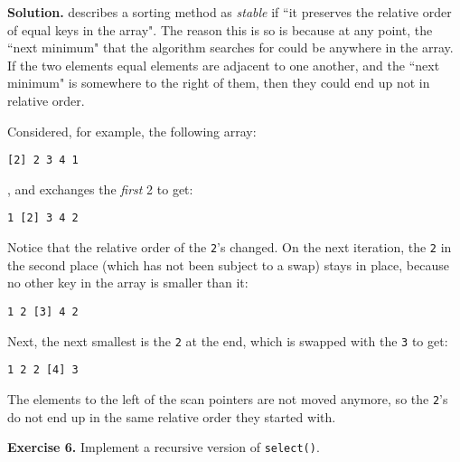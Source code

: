 \documentclass[12pt, a4paper]{article}
\newenvironment{ex}[2][Exercise]
{\par\medskip\noindent \textbf{#1 #2.}}
{\medskip}
\newenvironment{sol}[1][Solution]
{\par\medskip\noindent \textbf{#1.} }
{\medskip}
\begin{document}
	\begin{sol}
		\cite{sedgewick_wayne} describes a sorting method as \emph{stable}
		if ``it preserves the relative order of equal keys in the array".
		The reason this is so is because at any point, the ``next minimum"
		that the algorithm searches for could be anywhere in the array.
		If the two elements equal elements are adjacent to one another, and
		the ``next minimum" is somewhere to the right of them, then
		they could end up not in relative order.
		
		Considered, for example, the following array:
		\begin{lstlisting}[language={}]
[2] 2 3 4 1
		\end{lstlisting}, and exchanges the \emph{first} 2 to get:
		\begin{lstlisting}[language={}]
1 [2] 3 4 2
		\end{lstlisting}
		Notice that the relative order of the \texttt{2}'s changed. On
		the next iteration, the \texttt{2} in the second place (which
		has not been subject to a swap) stays in place, because no other
		key in the array is smaller than it:
		\begin{lstlisting}[language={}]
1 2 [3] 4 2
		\end{lstlisting}
		Next, the next smallest is the  \texttt{2} at the end, which is swapped
		with the \texttt{3} to get:
		\begin{lstlisting}[language={}]
1 2 2 [4] 3
		\end{lstlisting}
		The elements to the left of the scan pointers are not moved anymore,
		so the \texttt{2}'s do not end up in the same relative order they started
		with.
	\end{sol}
	\begin{ex}{6}
		Implement a recursive version of \texttt{select()}.
	\end{ex}
	
	\pagebreak
	\printbibliography
\end{document}
